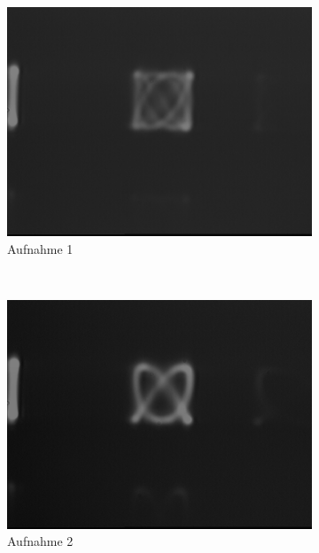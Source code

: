 \documentclass[bigchapter,colorback,accentcolor=tud4b,linedtoc,11pt]{tudreport}
\begin{document}
\begin{figure}[H]
  \centering
  \begin{subfigure}[h]{0.32\textwidth}
    \includegraphics[width=\textwidth]{data/Aufgabe7/4-3-(x-y)halbe.png}
    \caption[Cap for listoffigures]{Aufnahme 1}
  \end{subfigure}~%
  \begin{subfigure}[h]{0.32\textwidth}
    \includegraphics[width=\textwidth]{data/Aufgabe7/4-3-x.png}
    \caption[Cap for listoffigures]{Aufnahme 2}
  \end{subfigure}~%
  \begin{subfigure}[h]{0.32\textwidth}

\end{subfigure}
\end{figure}
\end{document}
